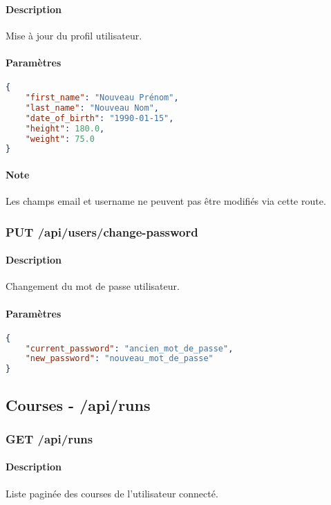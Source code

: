 \paragraph{Description}
Mise à jour du profil utilisateur.

\paragraph{Paramètres}
\begin{lstlisting}[language=json]
{
    "first_name": "Nouveau Prénom",
    "last_name": "Nouveau Nom",
    "date_of_birth": "1990-01-15",
    "height": 180.0,
    "weight": 75.0
}
\end{lstlisting}

\paragraph{Note}
Les champs email et username ne peuvent pas être modifiés via cette route.

\subsubsection{PUT /api/users/change-password}

\paragraph{Description}
Changement du mot de passe utilisateur.

\paragraph{Paramètres}
\begin{lstlisting}[language=json]
{
    "current_password": "ancien_mot_de_passe",
    "new_password": "nouveau_mot_de_passe"
}
\end{lstlisting}

\subsection{Courses - /api/runs}

\subsubsection{GET /api/runs}

\paragraph{Description}
Liste paginée des courses de l'utilisateur connecté.

